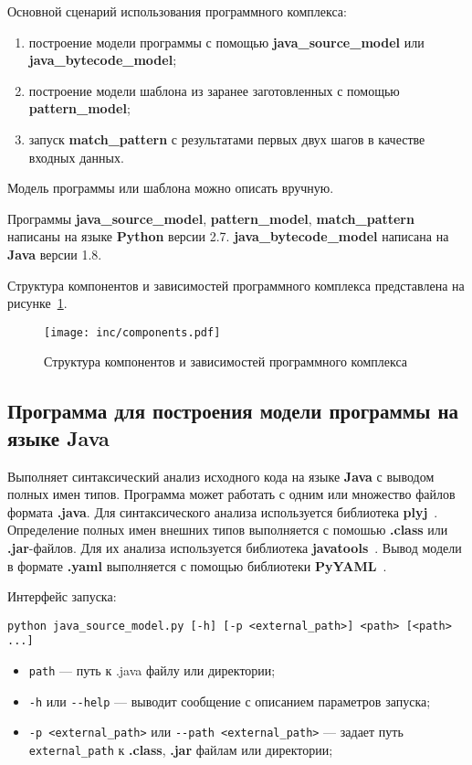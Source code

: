 Основной сценарий использования программного комплекса:
\begin{enumerate}
\item построение модели программы с помощью \textbf{java\_source\_model} или \textbf{java\_bytecode\_model};
\item построение модели шаблона из заранее заготовленных с помощью \textbf{pattern\_model};
\item запуск \textbf{match\_pattern} с результатами первых двух шагов в качестве входных данных.
\end{enumerate}

Модель программы или шаблона можно описать вручную.

Программы \textbf{java\_source\_model}, \textbf{pattern\_model},
\textbf{match\_pattern} написаны на языке \textbf{Python} версии 2.7.
\textbf{java\_bytecode\_model} написана на \textbf{Java} версии 1.8.

Структура компонентов и зависимостей программного комплекса представлена на
рисунке~\ref{fig:components}.

\begin{figure}[!ht]
\centering
\texttt{[image: inc/components.pdf]}
\caption{Структура компонентов и зависимостей программного комплекса}
\label{fig:components}
\end{figure}

\subsection{Программа для построения модели программы на языке Java}

Выполняет синтаксический анализ исходного кода на языке \textbf{Java} с выводом
полных имен типов.
Программа может работать с одним или множество файлов формата \textbf{.java}.
Для синтаксического анализа используется библиотека \textbf{plyj}~\cite{plyj}.
Определение полных имен внешних типов выполняется с помошью \textbf{.class} или
\textbf{.jar}-файлов.
Для их анализа используется библиотека \textbf{javatools}~\cite{javatools}.
Вывод модели в формате \textbf{.yaml} выполняется с помощью библиотеки
\textbf{PyYAML}~\cite{PyYAML}.

Интерфейс запуска:
\begin{verbatim}
python java_source_model.py [-h] [-p <external_path>] <path> [<path> ...]
\end{verbatim}

\begin{itemize}
\item \verb;path; --- путь к .java файлу или директории;
\item \verb;-h; или \verb;--help; --- выводит сообщение с описанием параметров
запуска;
\item \verb;-p <external_path>; или \verb;--path <external_path>; --- задает
путь \verb;external_path; к \textbf{.class}, \textbf{.jar} файлам или директории;
\end{itemize}

